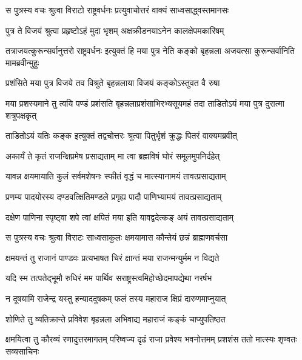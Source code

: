 
\twolineshloka
{स पुत्रस्य वचः श्रुत्वा विराटो राष्ट्रवर्धनः}
{प्रत्युवाचोत्तरं वाक्यं साध्वसाद्ध्वस्तमानसः}


\twolineshloka
{पुत्र ते विजयं श्रुत्वा प्रहृष्टोऽहं मुदा भृशम्}
{अक्षक्रीडनयाऽनेन कालक्षेपमकारिषम्}


\threelineshloka
{तत्राजयत्कुरून्सर्वानुत्तरो राष्ट्रवर्धनः}
{इत्युक्तं हि मया पुत्र नेति कङ्को बृहन्नला}
{अजयत्सा कुरून्सर्वानिति मामब्रवीन्मुहुः}


\twolineshloka
{प्रशंसिते मया पुत्र विजये तव विश्रुते}
{बृहन्नलाया विजयं कङ्कोऽस्तुवत वै रुषा}


\threelineshloka
{मया प्रशस्यमाने तु त्वयि पण्डं प्रशंसति}
{बृहन्नलाप्रशंसाभिरभ्यसूयमहं तदा}
{ताडितोऽयं मया पुत्र दुरात्मा शत्रुपक्षकृत्}


\twolineshloka
{ताडितोऽयं यतिः कङ्क इत्युक्तं तद्वचोत्तरः}
{श्रुत्वा पितुर्भृशं क्रुद्धः पितरं वाक्यमब्रवीत्}


\twolineshloka
{अकार्यं ते कृतं राजन्क्षिप्रमेष प्रसाद्यताम्}
{मा त्वा ब्रह्मविषं घोरं समूलमुपनिर्दहेत्}


\twolineshloka
{यावन्न क्षयमायाति कुलं सर्वमशेषनः}
{स्फीतं वृद्धं च मात्स्यानामयं तावत्प्रसाद्यताम्}


\twolineshloka
{प्रणम्य पादयोरस्य दण्डवत्क्षितिमण्डले}
{प्रगृह्य पादौ पाणिभ्यामयं तावत्प्रसाद्यताम्}


\twolineshloka
{दक्षेण पाणिना स्पृष्ट्वा शपे त्वां क्षपितं मया}
{इति यावद्वदेत्कङ् अयं तावत्प्रसाद्यताम्}


\twolineshloka
{स पुत्रस्य वचः श्रुत्वा विराटः साध्वसाकुलः}
{क्षमयामास कौन्तेयं छन्नं ब्राह्मणवर्चसा}


\twolineshloka
{क्षमयन्तं तु राजानं पाण्डवः प्रत्यभाषत}
{चिरं क्षान्तं मया राजन्मन्युर्मम न विद्यते}


\twolineshloka
{यदि स्म तत्पतेद्भूमौ रुधिरं मम पार्थिव}
{सराष्ट्रस्त्वमिहोच्छेदमापद्येथा नरर्षभ}


\twolineshloka
{न दूषयामि राजेन्द्र यस्तु हन्याददूषकम्}
{फलं तस्य महाराज क्षिप्रं दारुणमाप्नुयात्}



\twolineshloka
{शोणिते तु व्यतिक्रान्ते प्रविवेश बृहन्नला}
{अभिवाद्य महाराजं कङ्कं चाप्युपतिष्ठत}


\threelineshloka
{क्षमयित्वा तु कौरव्यं रणादुत्तरमागतम्}
{परिष्वज्य दृढं राजा प्रवेश्य भवनोत्तमम्}
{प्रशशंस ततो मात्स्यः शृण्वतः सव्यसाचिनः}





